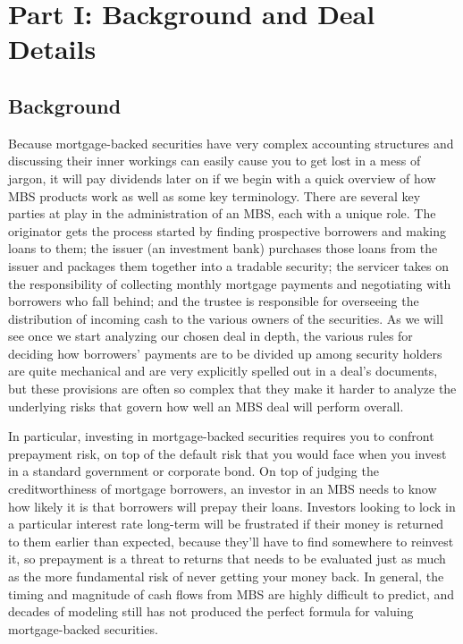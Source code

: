 \documentclass[12pt]{article}
\begin{document}
\section*{Part I: Background and Deal Details}
\subsection*{Background}

Because mortgage-backed securities have very complex accounting structures and discussing their inner workings can easily cause you to get lost in a mess of jargon, it will pay dividends later on if we begin with a quick overview of how MBS products work as well as some key terminology. There are several key parties at play in the administration of an MBS, each with a unique role. The originator gets the process started by finding prospective borrowers and making loans to them; the issuer (an investment bank) purchases those loans from the issuer and packages them together into a tradable security; the servicer takes on the responsibility of collecting monthly mortgage payments and negotiating with borrowers who fall behind; and the trustee is responsible for overseeing the distribution of incoming cash to the various owners of the securities. As we will see once we start analyzing our chosen deal in depth, the various rules for deciding how borrowers’ payments are to be divided up among security holders are quite mechanical and are very explicitly spelled out in a deal’s documents, but these provisions are often so complex that they make it harder to analyze the underlying risks that govern how well an MBS deal will perform overall.

In particular, investing in mortgage-backed securities requires you to confront prepayment risk, on top of the default risk that you would face when you invest in a standard government or corporate bond. On top of judging the creditworthiness of mortgage borrowers, an investor in an MBS needs to know how likely it is that borrowers will prepay their loans. Investors looking to lock in a particular interest rate long-term will be frustrated if their money is returned to them earlier than expected, because they’ll have to find somewhere to reinvest it, so prepayment is a threat to returns that needs to be evaluated just as much as the more fundamental risk of never getting your money back. In general, the timing and magnitude of cash flows from MBS are highly difficult to predict, and decades of modeling still has not produced the perfect formula for valuing mortgage-backed securities.
	
\end{document}

